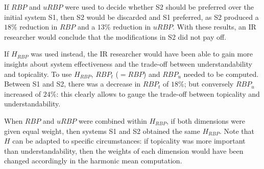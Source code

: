If $RBP$ and $uRBP$ were used to decide whether S2 should be preferred over the initial system S1, then S2 would be discarded and S1 preferred, as S2 produced a $18\%$ reduction in $RBP$ and a $13\%$ reduction in $uRBP$. With these results, an IR researcher would conclude that the modifications in S2 did not pay off.

If $H_{RBP}$ was used instead, the IR researcher would have been able to gain more insights about system effectiveness and the trade-off between understandability and topicality. To use $H_{RBP}$, $RBP_t$ ($=RBP$) and $RBP_u$ needed to be computed. Between S1 and S2, there was a decrease in $RBP_t$ of $18\%$; but conversely $RBP_u$ increased of $24\%$: this clearly allows to gauge the trade-off between topicality and understandability. 

When $RBP$ and $uRBP$ were combined within $H_{RBP}$, if both dimensions were given equal weight, then systems S1 and S2 obtained the same $H_{RBP}$. Note that $H$ can be adapted to specific circumstances: if topicality was more important than understandability, then the weights of each dimension would have been changed accordingly in the harmonic mean computation. 


